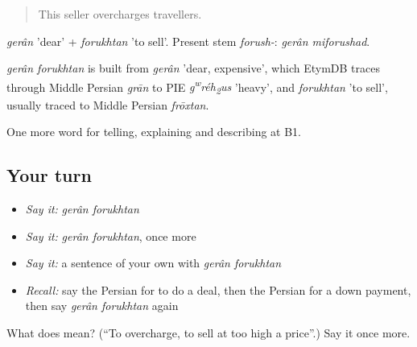 \begin{quote}
This seller overcharges travellers.
\end{quote}

\emph{gerân} 'dear' + \emph{forukhtan} 'to sell'. Present stem \emph{forush-}: \emph{gerân miforushad}.

\begin{cousinweb}
\emph{gerân forukhtan} is built from \emph{gerân} 'dear, expensive', which EtymDB traces through Middle Persian \emph{grān} to PIE \emph{g\textsuperscript{w}réh\textsubscript{2}us} 'heavy', and \emph{forukhtan} 'to sell', usually traced to Middle Persian \emph{frōxtan}.
\end{cousinweb}

\begin{grammarlens}[title={What you've built}]
One more word for telling, explaining and describing at B1.
\end{grammarlens}

\subsection*{Your turn}
\begin{itemize}
\raggedright
  \item \emph{Say it:} \emph{gerân forukhtan}
  \item \emph{Say it:} \emph{gerân forukhtan}, once more
  \item \emph{Say it:} a sentence of your own with \emph{gerân forukhtan}
  \item \emph{Recall:} say the Persian for to do a deal, then the Persian for a down payment, then say \emph{gerân forukhtan} again
\end{itemize}

\begin{tcolorbox}[breakable,colback=teal!4,colframe=teal!35!black,title={Before you move on}]
What does   mean? (\textquotedblleft{}To overcharge, to sell at too high a price\textquotedblright{}.) Say it once more.
\end{tcolorbox}
